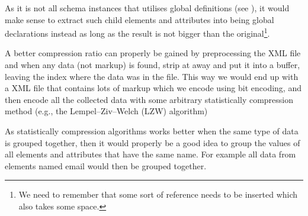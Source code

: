 \documentclass[a4paper, oneside]{memoir}
\theoremstyle{definition}
\begin{document}
\begin{description}
\item[Refactoring] As it is not all schema instances that utilises global
  definitions (see \label{sec:local-global-schema-definitions}), it would make
  sense to extract such child elements and attributes into being global
  declarations instead as long as the result is not bigger than the
  original\footnote{We need to remember that some sort of reference needs to be inserted
    which also takes some space.}.

\item A better compression ratio can properly be gained by preprocessing the XML
  file and when any data (not markup) is found, strip at away and put it into a
  buffer, leaving the index where the data was in the file. This way we would
  end up with a XML file that contains lots of markup which we encode using bit
  encoding, and then encode all the collected data with some arbitrary
  statistically compression method (e.g., the Lempel–Ziv–Welch (LZW) algorithm)

  As statistically compression algorithms works better when the same type of
  data is grouped together, then it would properly be a good idea to group the
  values of all elements and attributes that have the same name. For example all
  data from elements named email would then be grouped together.

\end{description}

\clearpage



\end{document}
